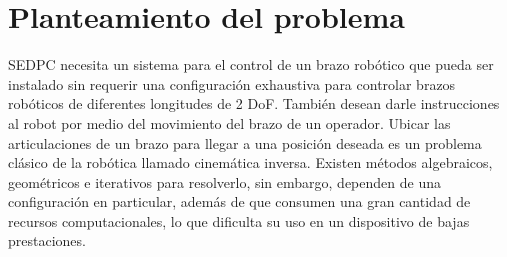 \section{Planteamiento del problema}

SEDPC necesita un sistema para el control de un brazo robótico que pueda ser instalado sin requerir una configuración exhaustiva para controlar brazos robóticos de diferentes longitudes de 2 DoF. También desean darle instrucciones al robot por medio del movimiento del brazo de un operador.
\newline\newline\newline
Ubicar las articulaciones de un brazo para llegar a una posición deseada es un problema clásico de la robótica llamado cinemática inversa. Existen métodos algebraicos, geométricos e iterativos para resolverlo, sin embargo, dependen de una configuración en particular, además de que consumen una gran cantidad de recursos computacionales, lo que dificulta su uso en un dispositivo de bajas prestaciones.